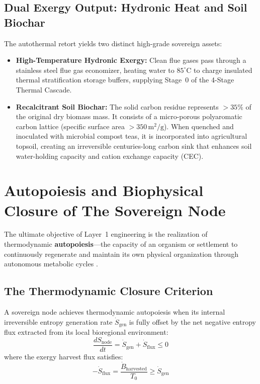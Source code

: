 \subsection{Dual Exergy Output: Hydronic Heat and Soil Biochar}
The autothermal retort yields two distinct high-grade sovereign assets:
\begin{itemize}
    \item \textbf{High-Temperature Hydronic Exergy:} Clean flue gases pass through a stainless steel flue gas economizer, heating water to $85^\circ\mathrm{C}$ to charge insulated thermal stratification storage buffers, supplying Stage~0 of the 4-Stage Thermal Cascade.
    \item \textbf{Recalcitrant Soil Biochar:} The solid carbon residue represents $>35\%$ of the original dry biomass mass. It consists of a micro-porous polyaromatic carbon lattice (specific surface area $>350\,\mathrm{m^2/g}$). When quenched and inoculated with microbial compost teas, it is incorporated into agricultural topsoil, creating an irreversible centuries-long carbon sink that enhances soil water-holding capacity and cation exchange capacity (CEC).
\end{itemize}

\section{Autopoiesis and Biophysical Closure of The Sovereign Node}
\label{sec:th_autopoiesis}

The ultimate objective of Layer~1 engineering is the realization of thermodynamic \textbf{autopoiesis}---the capacity of an organism or settlement to continuously regenerate and maintain its own physical organization through autonomous metabolic cycles \cite{maturana1980autopoiesis}.

\subsection{The Thermodynamic Closure Criterion}
A sovereign node achieves thermodynamic autopoiesis when its internal irreversible entropy generation rate $\dot{S}_{\mathrm{gen}}$ is fully offset by the net negative entropy flux extracted from its local bioregional environment:
\begin{equation}
\frac{dS_{\mathrm{node}}}{dt} = \dot{S}_{\mathrm{gen}} + \dot{S}_{\mathrm{flux}} \le 0
\label{eq:autopoiesis_condition}
\end{equation}
where the exergy harvest flux satisfies:
\begin{equation}
-\dot{S}_{\mathrm{flux}} = \frac{\dot{B}_{\mathrm{harvested}}}{T_0} \ge \dot{S}_{\mathrm{gen}}
\label{eq:negentropy_harvest_target}
\end{equation}

